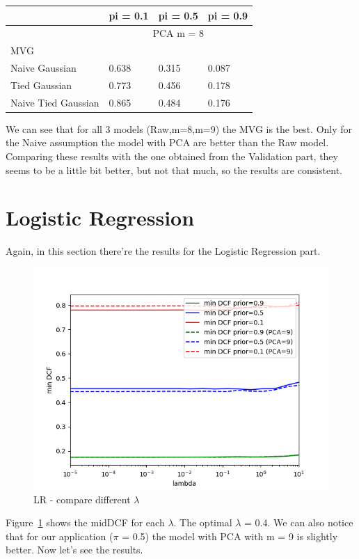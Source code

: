 \documentclass[english]{report}
\begin{document}
\begin{table}[H]
    \centering
    \begin{tabular}{@{}llll@{}}
    \toprule
                        & pi = 0.1  & pi = 0.5  & pi = 0.9 \\ \midrule
                        & \multicolumn{3}{c}{PCA m = 8} \\ \midrule
    MVG                 & \color{red}{0.571}     & \color{red}{0.271}     & \color{red}{0.083}    \\
    Naive Gaussian      & 0.638     & 0.315     & 0.087    \\
    Tied Gaussian       & 0.773     & 0.456     & 0.178    \\
    Naive Tied Gaussian & 0.865     & 0.484     & 0.176    \\ \bottomrule
    \end{tabular}
    \label{tab:MVG_PCA8_valid_eval}
\end{table}

We can see that for all 3 models (Raw,m=8,m=9) the MVG is the best. Only for the Naive assumption the model with PCA are better
than the Raw model. \newline
Comparing these results with the one obtained from the Validation part, they seems to be a little bit better, but not that much, so
the results are consistent. 

\newpage

\section{Logistic Regression}
Again, in this section there're the results for the Logistic Regression part.

\begin{figure}[h!]
    \includegraphics[scale=0.5]{../../images/evaluation/LR_PCA_minDCF_comparison.png}
    \centering
    \caption{LR - compare different $\lambda$}
    \label{fig:LR_eval}
\end{figure}
Figure~\ref{fig:LR_eval} shows the midDCF for each $\lambda$. The optimal $\lambda$ = 0.4. We can also notice
that for our application ($\pi$ = 0.5) the model with PCA with m = 9 is slightly better. Now let's see the results.
\end{document}
